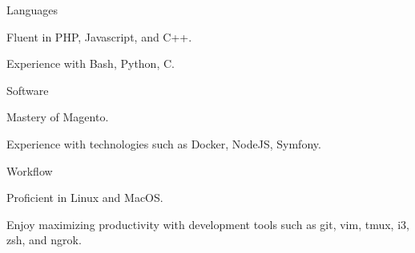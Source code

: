 \begin{cvskills}
  \cvskill
    {Languages}
    {
      \begin{cvitems}
        \item Fluent in PHP, Javascript, and C++.
        \item Experience with Bash, Python, C.
      \end{cvitems}
    }
  \cvskill
    {Software}
    {
      \begin{cvitems}
        \item Mastery of Magento.
        \item Experience with technologies such as Docker, NodeJS, Symfony.
      \end{cvitems}
    }
  \cvskill
    {Workflow}
    {
      \begin{cvitems}
        \item Proficient in Linux and MacOS.
        \item Enjoy maximizing productivity with development tools such as git, vim, tmux, i3, zsh, and ngrok.
      \end{cvitems}
    }
\end{cvskills}
